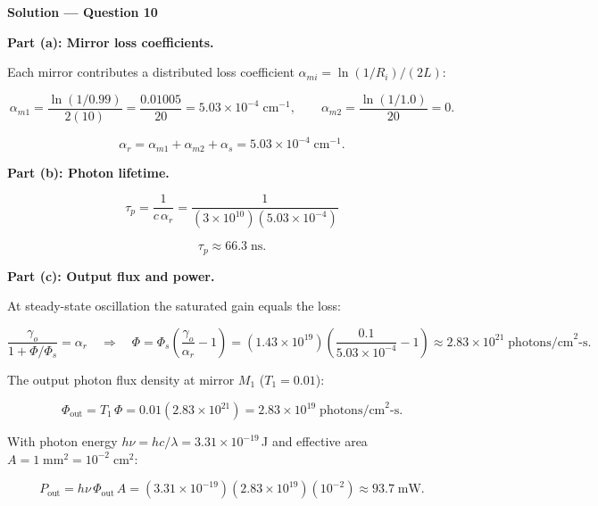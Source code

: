 \textbf{\large Solution --- Question 10}

\textbf{Part (a): Mirror loss coefficients.}

Each mirror contributes a distributed loss coefficient $\alpha_{mi} = \ln(1/R_i)/(2L)$:

\begin{equation*}
  \alpha_{m1} = \frac{\ln(1/0.99)}{2(10)} = \frac{0.01005}{20} = 5.03\times10^{-4}\;\text{cm}^{-1},\qquad
  \alpha_{m2} = \frac{\ln(1/1.0)}{20} = 0.
\end{equation*}

\begin{equation*}
  \boxed{\alpha_r = \alpha_{m1} + \alpha_{m2} + \alpha_s = 5.03\times10^{-4}\;\text{cm}^{-1}.}
\end{equation*}

\textbf{Part (b): Photon lifetime.}

\begin{equation*}
  \tau_p = \frac{1}{c\,\alpha_r} = \frac{1}{(3\times10^{10})(5.03\times10^{-4})}
\end{equation*}

\begin{equation*}
  \boxed{\tau_p \approx 66.3\;\text{ns}.}
\end{equation*}

\textbf{Part (c): Output flux and power.}

At steady-state oscillation the saturated gain equals the loss:

\begin{equation*}
  \frac{\gamma_o}{1 + \Phi/\Phi_s} = \alpha_r
  \quad\Longrightarrow\quad
  \Phi = \Phi_s\left(\frac{\gamma_o}{\alpha_r} - 1\right)
  = (1.43\times10^{19})\left(\frac{0.1}{5.03\times10^{-4}} - 1\right)
  \approx 2.83\times10^{21}\;\text{photons/cm}^{2}\text{-s.}
\end{equation*}

The output photon flux density at mirror $M_1$ ($T_1 = 0.01$):

\begin{equation*}
  \Phi_{\text{out}} = T_1\,\Phi = 0.01(2.83\times10^{21}) = 2.83\times10^{19}\;\text{photons/cm}^{2}\text{-s.}
\end{equation*}

With photon energy $h\nu = hc/\lambda = 3.31\times10^{-19}$\,J and effective area $A = 1\;\text{mm}^2 = 10^{-2}\;\text{cm}^2$:

\begin{equation*}
  \boxed{P_{\text{out}} = h\nu\,\Phi_{\text{out}}\,A = (3.31\times10^{-19})(2.83\times10^{19})(10^{-2}) \approx 93.7\;\text{mW}.}
\end{equation*}


